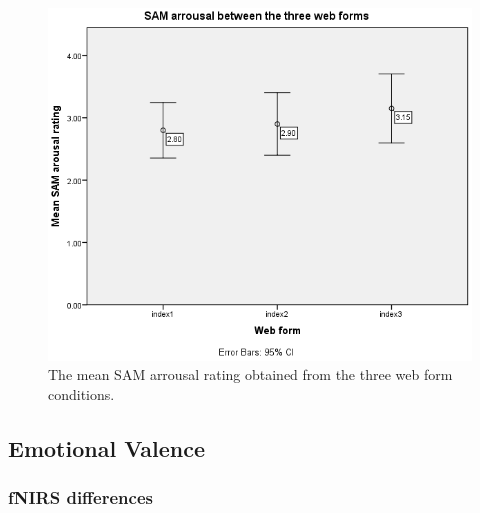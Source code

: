 \documentclass[a4paper]{report}
\begin{document}
			\begin{figure}[h]
				\centering
				\includegraphics[width=0.7\linewidth]{sam-arrousal-index123}
				\caption[SAM arrousal between the three web forms]{The mean SAM arrousal rating obtained from the three web form conditions.}
				\label{fig:sam-arrousal-index123}
			\end{figure}
			
		\subsection{Emotional Valence}
			\subsubsection{fNIRS differences}
\end{document}
